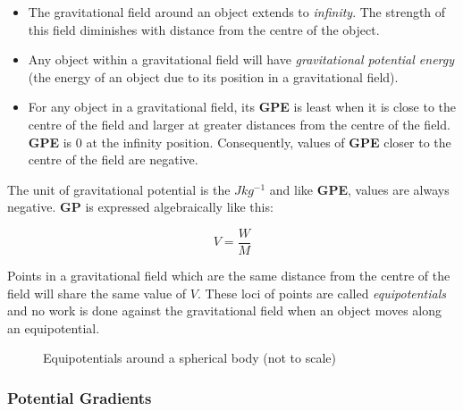 \documentclass[12pt]{article}
\begin{document}
\begin{itemize}
\item The gravitational field around an object extends to \emph{infinity}. The strength of this field diminishes with distance from the centre of the object.

\item Any object within a gravitational field will have \emph{gravitational potential energy} (the energy of an object due to its position in a gravitational field).

\item For any object in a gravitational field, its \textbf{GPE} is least when it is close to the centre of the field and larger at greater distances from the centre of the field. \textbf{GPE} is \(0\) at the infinity position. Consequently, values of \textbf{GPE} closer to the centre of the field are negative.
\end{itemize}

The unit of gravitational potential is the \(Jkg^{-1}\) and like \textbf{GPE}, values are always negative. \textbf{GP} is expressed algebraically like this:

\[V = \dfrac{W}{M}\]

Points in a gravitational field which are the same distance from the centre of the field will share the same value of \(V\). These loci of points are called \emph{equipotentials} and no work is done against the gravitational field when an object moves along an equipotential.


\begin{figure}[H]
\centering
{}
\caption{Equipotentials around a spherical body (not to scale)}
\end{figure}

\subsubsection{Potential Gradients}
\label{sec:org12b15cd}
\end{document}
